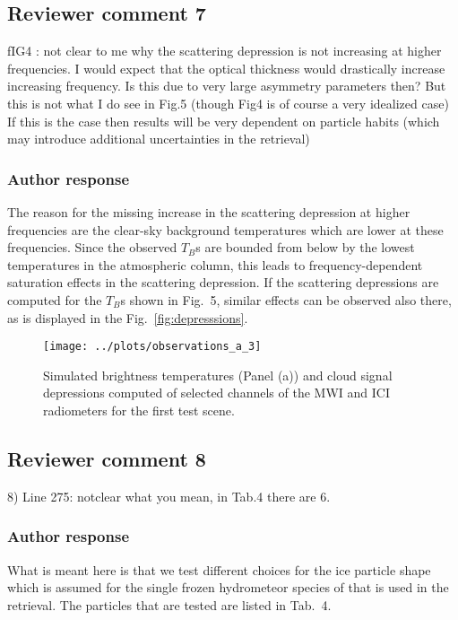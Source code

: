 \documentclass[11pt]{scrartcl}
\begin{document}
\subsection*{Reviewer comment 7}

fIG4 : not clear to me why the scattering depression is not increasing at
higher frequencies. I would expect that the optical thickness would drastically
increase increasing frequency. Is this due to very large asymmetry parameters
then? But this is not what I do see in Fig.5 (though Fig4 is of course a very
idealized case) If this is the case then results will be very dependent on
particle habits (which may introduce additional uncertainties in the retrieval)

\subsubsection*{Author response}

The reason for the missing increase in the scattering depression at higher
frequencies are the clear-sky background temperatures which are lower at these
frequencies. Since the observed $T_B$s are bounded from below by the lowest
temperatures in the atmospheric column, this leads to frequency-dependent
saturation effects in the scattering depression. If the scattering depressions
are computed for the $T_B$s shown in Fig.~5, similar effects can be observed also
there, as is displayed in the Fig.~\ref{fig:depresssions}.

\begin{figure}[!hbpt]
  \centering
  \texttt{[image: ../plots/observations\_a\_3]}
  \caption{Simulated brightness temperatures (Panel (a)) and cloud signal
    depressions computed of selected channels of the MWI and ICI radiometers
    for the first test scene.}
  \label{fig:depressions}
\end{figure}

\subsection*{Reviewer comment 8}
8) Line 275: notclear what you mean, in Tab.4 there are 6. 

\subsubsection*{Author response}

What is meant here is that we test different choices for the ice particle shape
which is assumed for the single frozen hydrometeor species of that is used in
the retrieval. The particles that are tested are listed in Tab.~4.
\end{document}
